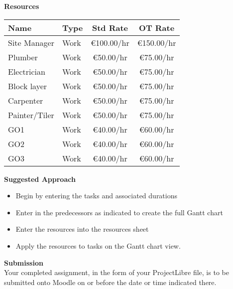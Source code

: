 \newpage
\large\textbf{Resources}\\
\vspace{.25cm}

\begin{tabular}{|l|l|c|c|}
	\hline 
	\textbf{Name} & \textbf{Type} & \textbf{Std Rate} & \textbf{OT Rat}e \\ 
	\hline 
	Site Manager	& Work	& \euro100.00/hr & 	\euro150.00/hr\\
	Plumber			& Work	& \euro50.00/hr	& \euro75.00/hr\\
	Electrician		& Work	& \euro50.00/hr	& \euro75.00/hr\\
	Block layer		& Work	& \euro50.00/hr	& \euro75.00/hr\\
	Carpenter		& Work	& \euro50.00/hr	& \euro75.00/hr\\
	Painter/Tiler	& Work	& \euro50.00/hr	& \euro75.00/hr\\
	GO1				& Work	& \euro40.00/hr	& \euro60.00/hr\\
	GO2				& Work	& \euro40.00/hr	& \euro60.00/hr\\
	GO3				& Work	& \euro40.00/hr	& \euro60.00/hr\\
	\hline
\end{tabular} 



\vspace{.5cm}

\large\textbf{Suggested Approach}\\

\begin{itemize}
	\item Begin by entering the tasks and associated durations
	\item Enter in the predecessors as indicated to create the full Gantt chart
	\item Enter the resources into the resources sheet
	\item Apply the resources to tasks on the Gantt chart view.

\end{itemize}

\vspace{1cm}

\large\textbf{Submission}\\
Your completed assignment, in the form of your ProjectLibre file, is to be submitted onto Moodle on or before the date or time indicated there.

